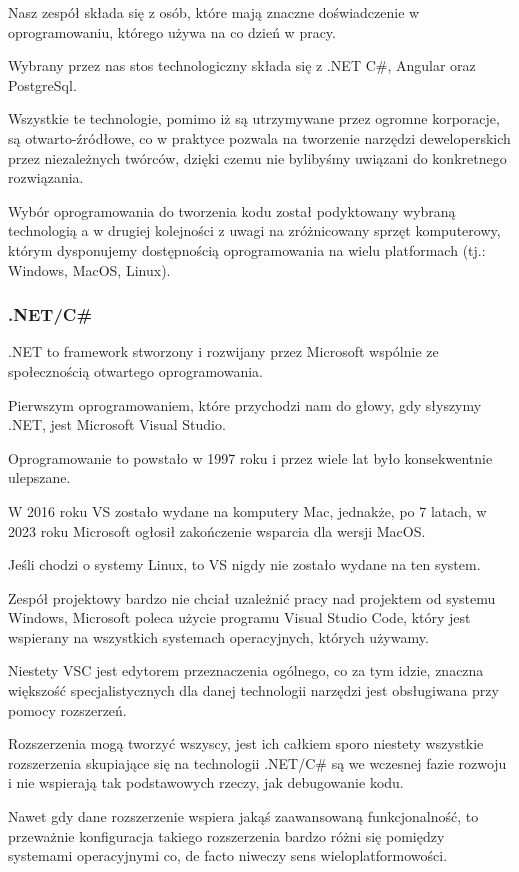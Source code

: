 Nasz zespół składa się z osób, które mają znaczne doświadczenie w oprogramowaniu, którego używa na co dzień w pracy.

Wybrany przez nas stos technologiczny składa się z .NET C\#, Angular oraz PostgreSql.

Wszystkie te technologie, pomimo iż są utrzymywane przez ogromne korporacje, są otwarto-źródłowe, co w praktyce pozwala na tworzenie narzędzi deweloperskich przez niezależnych twórców, dzięki czemu nie bylibyśmy uwiązani do konkretnego rozwiązania.

Wybór oprogramowania do tworzenia kodu został podyktowany wybraną technologią a w drugiej kolejności z uwagi na zróżnicowany sprzęt komputerowy, którym dysponujemy  dostępnością oprogramowania na wielu platformach (tj.: Windows, MacOS, Linux).

\subsubsection{.NET/C\#}
.NET to framework stworzony i rozwijany przez Microsoft wspólnie ze społecznością otwartego oprogramowania.

Pierwszym oprogramowaniem, które przychodzi nam do głowy, gdy słyszymy .NET, jest Microsoft Visual Studio.

Oprogramowanie to powstało w 1997 roku i przez wiele lat było konsekwentnie ulepszane.

W 2016 roku VS zostało wydane na komputery Mac, jednakże, po 7 latach, w 2023 roku Microsoft ogłosił zakończenie wsparcia dla wersji MacOS.

Jeśli chodzi o systemy Linux, to VS nigdy nie zostało wydane na ten system.

Zespół projektowy bardzo nie chciał uzależnić pracy nad projektem od systemu Windows, Microsoft poleca użycie programu Visual Studio Code, który jest wspierany na wszystkich systemach operacyjnych, których używamy.

Niestety VSC jest edytorem przeznaczenia ogólnego, co za tym idzie, znaczna większość specjalistycznych dla danej technologii narzędzi jest obsługiwana przy pomocy rozszerzeń.

Rozszerzenia mogą tworzyć wszyscy, jest ich całkiem sporo niestety wszystkie rozszerzenia skupiające się na technologii .NET/C\# są we wczesnej fazie rozwoju i nie wspierają tak podstawowych rzeczy, jak debugowanie kodu.

Nawet gdy dane rozszerzenie wspiera jakąś zaawansowaną funkcjonalność, to przeważnie konfiguracja takiego rozszerzenia bardzo różni się pomiędzy systemami operacyjnymi co, de facto niweczy sens wieloplatformowości.

